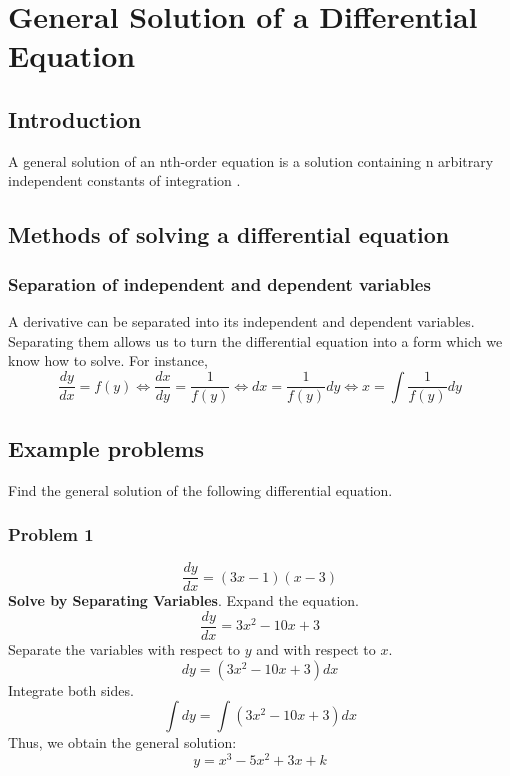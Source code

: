 \documentclass[hidelinks, a4paper, 12pt]{article}
\begin{document}
    \section{General Solution of a Differential Equation}
        \subsection{Introduction}
            A general solution of an nth-order equation is a solution containing n arbitrary independent constants of integration \cite{kreyszig1999advanced}.
        \subsection{Methods of solving a differential equation}
            \subsubsection{Separation of independent and dependent variables}
                A derivative can be separated into its independent and dependent variables.
                Separating them allows us to turn the differential equation into a form which we know how to solve.
                For instance,
                \[\frac{dy}{dx} = f(y) \Leftrightarrow \frac{dx}{dy} = \frac{1}{f(y)} \Leftrightarrow dx = \frac{1}{f(y)}dy \Leftrightarrow x = \int \frac{1}{f(y)}dy\]
        \subsection{Example problems}
            Find the general solution of the following differential equation.
            \subsubsection{Problem 1}
                \[\frac{dy}{dx} = (3x - 1)(x-3)\]
                \textbf{Solve by Separating Variables}. Expand the equation.
                \[\frac{dy}{dx} = 3x^2 - 10x + 3\]
                Separate the variables with respect to $y$ and with respect to $x$.
                \[dy = (3x^2 - 10x + 3)dx\]
                Integrate both sides.
                \[\int dy = \int (3x^2 - 10x + 3)dx\]
                Thus, we obtain the general solution:
                \[y = x^3 - 5x^2 + 3x + k\]
\end{document}
